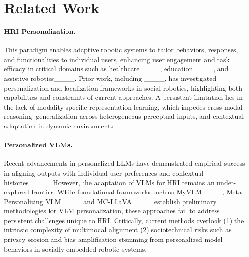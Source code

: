 \section{Related Work}
\paragraph{HRI Personalization.}
This paradigm enables adaptive robotic systems to tailor behaviors, responses, and functionalities to individual users, enhancing user engagement and task efficacy in critical domains such as healthcare____, education____, and assistive robotics____. Prior work, including ____, has investigated personalization and localization frameworks in social robotics, highlighting both capabilities and constraints of current approaches. A persistent limitation lies in the lack of modality-specific representation learning, which impedes cross-modal reasoning, generalization across heterogeneous perceptual inputs, and contextual adaptation in dynamic environments____.

\paragraph{Personalized VLMs.} Recent advancements in personalized LLMs have demonstrated empirical success in aligning outputs with individual user preferences and contextual histories____. However, the adaptation of VLMs for HRI remains an under-explored frontier. While foundational frameworks such as MyVLM____, Meta-Personalizing VLM____ and MC-LLaVA____ establish preliminary methodologies for VLM personalization, these approaches fail to address persistent challenges unique to HRI. Critically, current methods overlook (1) the intrinsic complexity of multimodal alignment (2) sociotechnical risks such as privacy erosion and bias amplification stemming from personalized model behaviors in socially embedded robotic systems. %



